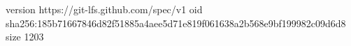 version https://git-lfs.github.com/spec/v1
oid sha256:185b71667846d82f51885a4aee5d71e819f061638a2b568e9bf199982c09d6d8
size 1203
